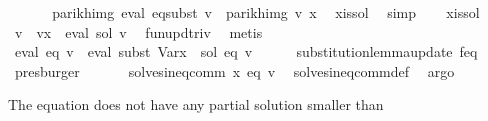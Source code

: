 \begin{isabellebody}
\ \ \isamarkupfalse%
\ \isamarkupfalse%
\ {\isacharasterisk}{\kern0pt}{\isacharcolon}{\kern0pt}\ {\isachardoublequoteopen}parikh{\isacharunderscore}{\kern0pt}img\ {\isacharparenleft}{\kern0pt}eval\ {\isacharquery}{\kern0pt}eq{\isacharunderscore}{\kern0pt}subst\ v{\isacharparenright}{\kern0pt}\ {\isasymsubseteq}\ parikh{\isacharunderscore}{\kern0pt}img\ {\isacharparenleft}{\kern0pt}v\ x{\isacharparenright}{\kern0pt}{\isachardoublequoteclose}\ \isamarkupfalse%
\ x{\isacharunderscore}{\kern0pt}is{\isacharunderscore}{\kern0pt}sol\ \isamarkupfalse%
\ simp\isanewline
\isanewline
\ \ \isamarkupfalse%
\ x{\isacharunderscore}{\kern0pt}is{\isacharunderscore}{\kern0pt}sol\ \isamarkupfalse%
\ {\isachardoublequoteopen}v\ {\isacharequal}{\kern0pt}\ v{\isacharparenleft}{\kern0pt}x\ {\isacharcolon}{\kern0pt}{\isacharequal}{\kern0pt}\ eval\ sol\ v{\isacharparenright}{\kern0pt}{\isachardoublequoteclose}\ \isamarkupfalse%
\ fun{\isacharunderscore}{\kern0pt}upd{\isacharunderscore}{\kern0pt}triv\ \isamarkupfalse%
\ metis\isanewline
\ \ \isamarkupfalse%
\ \isamarkupfalse%
\ {\isachardoublequoteopen}eval\ eq\ v\ {\isacharequal}{\kern0pt}\ eval\ {\isacharparenleft}{\kern0pt}subst\ {\isacharparenleft}{\kern0pt}Var{\isacharparenleft}{\kern0pt}x\ {\isacharcolon}{\kern0pt}{\isacharequal}{\kern0pt}\ sol{\isacharparenright}{\kern0pt}{\isacharparenright}{\kern0pt}\ eq{\isacharparenright}{\kern0pt}\ v{\isachardoublequoteclose}\isanewline
\ \ \ \ \isamarkupfalse%
\ substitution{\isacharunderscore}{\kern0pt}lemma{\isacharunderscore}{\kern0pt}update{\isacharbrackleft}{\kern0pt}\ f{\isacharequal}{\kern0pt}eq{\isacharbrackright}{\kern0pt}\ \isamarkupfalse%
\ presburger\isanewline
\ \ \isamarkupfalse%
\ {\isacharasterisk}{\kern0pt}\ \isamarkupfalse%
\ {\isachardoublequoteopen}solves{\isacharunderscore}{\kern0pt}ineq{\isacharunderscore}{\kern0pt}comm\ x\ eq\ v{\isachardoublequoteclose}\ \isamarkupfalse%
\ solves{\isacharunderscore}{\kern0pt}ineq{\isacharunderscore}{\kern0pt}comm{\isacharunderscore}{\kern0pt}def\ \isamarkupfalse%
\ argo\isanewline
{}\isamarkupfalse%
%
\endisatagproof
{\isafoldproof}%
%
\isadelimproof
%
\endisadelimproof
%
\begin{isamarkuptext}%
The equation does not have any partial solution smaller than %

\end{isamarkuptext}
\end{isabellebody}
